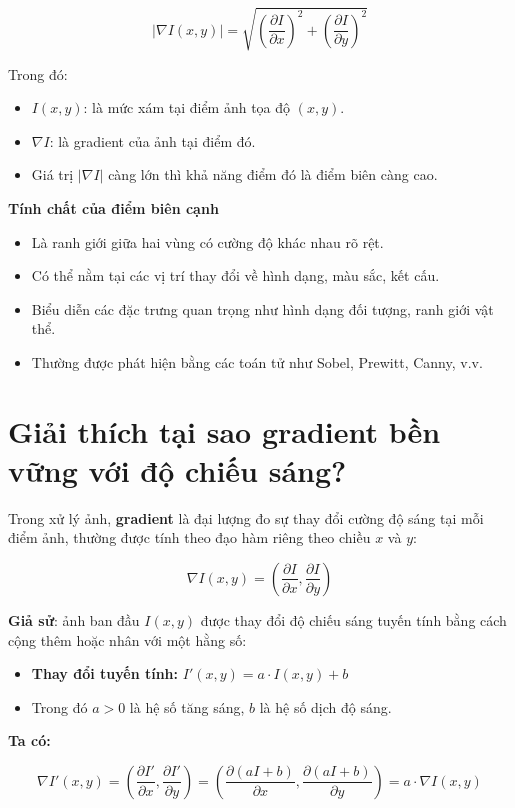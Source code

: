 \documentclass[12pt]{article}
\begin{document}
	\[
	|\nabla I(x, y)| = \sqrt{ \left( \frac{\partial I}{\partial x} \right)^2 + \left( \frac{\partial I}{\partial y} \right)^2 }
	\]
	
	Trong đó:
	\begin{itemize}
	\item $I(x, y)$: là mức xám tại điểm ảnh tọa độ $(x, y)$.
	\item $\nabla I$: là gradient của ảnh tại điểm đó.
	\item Giá trị $|\nabla I|$ càng lớn thì khả năng điểm đó là điểm biên càng cao.
	\end{itemize}
	
	\textbf{Tính chất của điểm biên cạnh}
	
	\begin{itemize}
	\item Là ranh giới giữa hai vùng có cường độ khác nhau rõ rệt.
	\item Có thể nằm tại các vị trí thay đổi về hình dạng, màu sắc, kết cấu.
	\item Biểu diễn các đặc trưng quan trọng như hình dạng đối tượng, ranh giới vật thể.
	\item Thường được phát hiện bằng các toán tử như Sobel, Prewitt, Canny, v.v.
	\end{itemize}
	
	\section{Giải thích tại sao gradient bền vững với độ chiếu sáng?}
	
	Trong xử lý ảnh, \textbf{gradient} là đại lượng đo sự thay đổi cường độ sáng tại mỗi điểm ảnh, thường được tính theo đạo hàm riêng theo chiều $x$ và $y$:
	
	\[
	\nabla I(x, y) = \left( \frac{\partial I}{\partial x}, \frac{\partial I}{\partial y} \right)
	\]
	
	\textbf{Giả sử}: ảnh ban đầu $I(x, y)$ được thay đổi độ chiếu sáng tuyến tính bằng cách cộng thêm hoặc nhân với một hằng số:
	
	\begin{itemize}
	\item \textbf{Thay đổi tuyến tính:} $I'(x, y) = a \cdot I(x, y) + b$
	\item Trong đó $a > 0$ là hệ số tăng sáng, $b$ là hệ số dịch độ sáng.
	\end{itemize}
	
	\textbf{Ta có:}
	
	\[
	\nabla I'(x, y) = \left( \frac{\partial I'}{\partial x}, \frac{\partial I'}{\partial y} \right)
	= \left( \frac{\partial (aI + b)}{\partial x}, \frac{\partial (aI + b)}{\partial y} \right)
	= a \cdot \nabla I(x, y)
	\]
	
\end{document}
